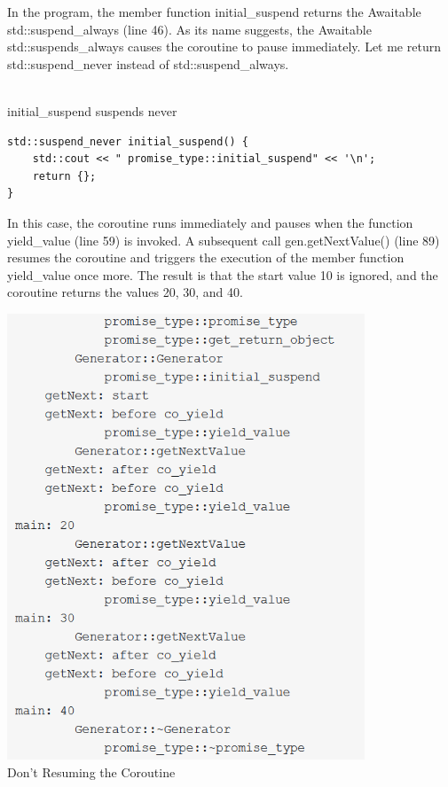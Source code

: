In the program, the member function initial\_suspend returns the Awaitable std::suspend\_always (line 46). As its name suggests, the Awaitable std::suspends\_always causes the coroutine to pause immediately. Let me return std::suspend\_never instead of std::suspend\_always.

\hspace*{\fill} \\ %
\noindent
initial\_suspend suspends never
\begin{lstlisting}[style=styleCXX]
std::suspend_never initial_suspend() {
	std::cout << " promise_type::initial_suspend" << '\n';
	return {};
}
\end{lstlisting}

In this case, the coroutine runs immediately and pauses when the function yield\_value (line 59) is invoked. A subsequent call gen.getNextValue() (line 89) resumes the coroutine and triggers the execution of the member function yield\_value once more. The result is that the start value 10 is ignored, and the coroutine returns the values 20, 30, and 40.

\begin{center}
\includegraphics[width=0.8\textwidth]{content/3/chapter7/images/16.png}\\
Don’t Resuming the Coroutine
\end{center}

